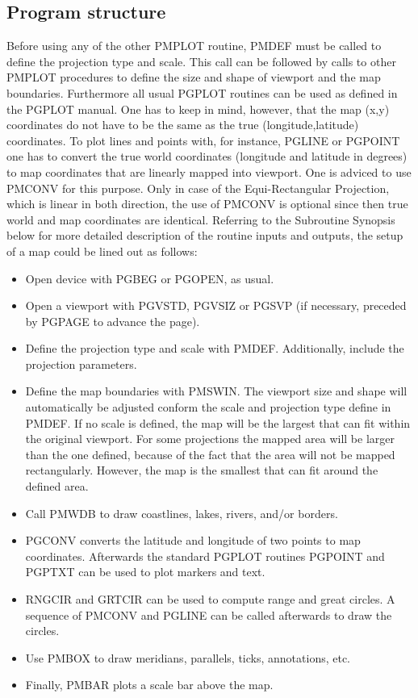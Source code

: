 \documentclass[titlepage,a4paper]{article}
\begin{document}
\subsection{Program structure}
Before using any of the other PMPLOT routine, PMDEF must be called to define
the projection type and scale. This call can be followed by calls to other
PMPLOT procedures to define the size and shape of viewport and the map
boundaries. Furthermore all usual PGPLOT routines can be used as defined in
the PGPLOT manual. One has to keep in mind, however, that the map (x,y)
coordinates do not have to be the same as the true (longitude,latitude)
coordinates. To plot lines and points with, for instance, PGLINE or PGPOINT
one has to convert the true world coordinates (longitude and latitude in
degrees) to map coordinates that are linearly mapped into viewport. One is
adviced to use PMCONV for this purpose. Only in case of the Equi-Rectangular
Projection, which is linear in both direction, the use of PMCONV is optional
since then true world and map coordinates are identical.
Referring to the Subroutine Synopsis below for more detailed description of the
routine inputs and outputs, the setup of a map could be lined out as follows:
\begin{itemize}
\item Open device with PGBEG or PGOPEN, as usual.
\item Open a viewport with PGVSTD, PGVSIZ or PGSVP (if necessary, preceded
    by PGPAGE to advance the page).
\item Define the projection type and scale with PMDEF. Additionally, include
    the projection parameters.
\item Define the map boundaries with PMSWIN. The viewport size and shape will
    automatically be adjusted conform the scale and projection type define in
    PMDEF. If no scale is defined, the map will be the largest that can fit
    within the original viewport. For some projections the mapped area will
    be larger than the one defined, because of the fact that the area will not
    be mapped rectangularly. However, the map is the smallest that can fit
    around the defined area.
\item Call PMWDB to draw coastlines, lakes, rivers, and/or borders.
\item PGCONV converts the latitude and longitude of two points to map
    coordinates. Afterwards the standard PGPLOT routines PGPOINT and
    PGPTXT can be used to plot markers and text.
\item RNGCIR and GRTCIR can be used to compute range and great circles.
    A sequence of PMCONV and PGLINE can be called afterwards to draw the
    circles.
\item Use PMBOX to draw meridians, parallels, ticks, annotations, etc.
\item Finally, PMBAR plots a scale bar above the map.
\end{itemize}
\end{document}
